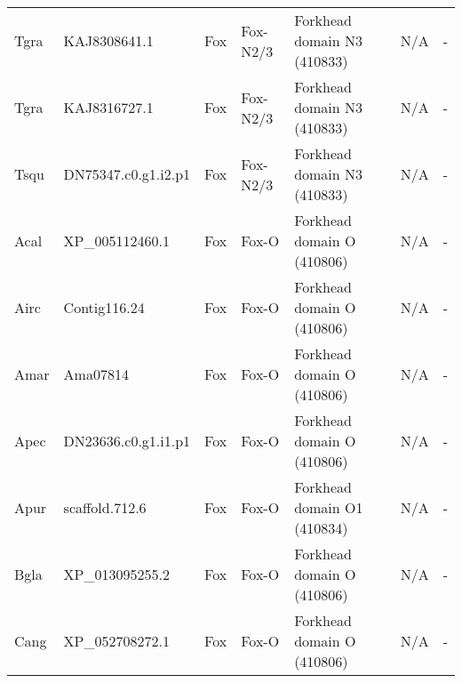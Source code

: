 \documentclass[../main.tex]{subfiles}
\begin{document}
\begin{landscape}
\begin{longtable}{lllllll}
		Tgra           & KAJ8308641.1          & Fox            & Fox-N2/3            & Forkhead domain N3 (410833)                 & N/A                                                                    & -                    \\
		Tgra           & KAJ8316727.1          & Fox            & Fox-N2/3            & Forkhead domain N3 (410833)                 & N/A                                                                    & -                    \\
		Tsqu           & DN75347.c0.g1.i2.p1   & Fox            & Fox-N2/3            & Forkhead domain N3 (410833)                 & N/A                                                                    & -                    \\
		Acal           & XP\_005112460.1       & Fox            & Fox-O               & Forkhead domain O (410806)                  & N/A                                                                    & -                    \\
		Airc           & Contig116.24          & Fox            & Fox-O               & Forkhead domain O (410806)                  & N/A                                                                    & -                    \\
		Amar           & Ama07814              & Fox            & Fox-O               & Forkhead domain O (410806)                  & N/A                                                                    & -                    \\
		Apec           & DN23636.c0.g1.i1.p1   & Fox            & Fox-O               & Forkhead domain O (410806)                  & N/A                                                                    & -                    \\
		Apur           & scaffold.712.6        & Fox            & Fox-O               & Forkhead domain O1 (410834)                 & N/A                                                                    & -                    \\
		Bgla           & XP\_013095255.2       & Fox            & Fox-O               & Forkhead domain O (410806)                  & N/A                                                                    & -                    \\
		Cang           & XP\_052708272.1       & Fox            & Fox-O               & Forkhead domain O (410806)                  & N/A                                                                    & -                    \\

\end{longtable}
\end{landscape}
\end{document}

